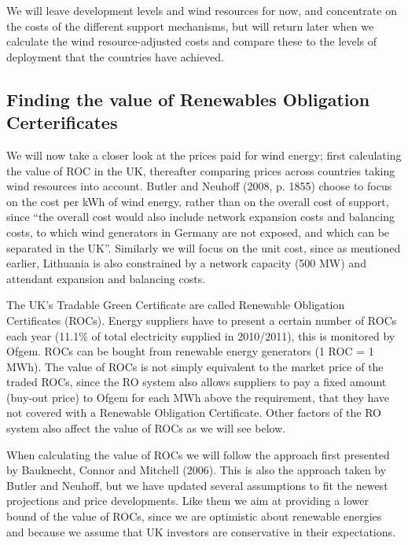 \documentclass[a4paper, 12pt]{article}
\begin{document}
We will leave development levels and wind resources for now, and concentrate on the costs of the different support mechanisms, but will return later when we calculate the wind resource-adjusted costs and compare these to the levels of deployment that the countries have achieved.

\subsection{Finding the value of Renewables Obligation Certerificates}

We will now take a closer look at the prices paid for wind energy; first calculating the value of ROC in the UK, thereafter comparing prices across countries taking wind resources into account. Butler and Neuhoff (2008, p. 1855) choose to focus on the cost per kWh of wind energy, rather than on the overall cost of support, since ``the overall cost would also include network expansion costs and balancing costs, to which wind generators in Germany are not exposed, and which can be separated in the UK''. Similarly we will focus on the unit cost, since as mentioned earlier, Lithuania is also constrained by a network capacity (500 MW) and attendant expansion and balancing costs.

The UK's Tradable Green Certificate are called Renewable Obligation Certificates (ROCs). Energy suppliers have to present a certain number of ROCs each year (11.1\% of total electricity supplied in 2010/2011), this is monitored by Ofgem. ROCs can be bought from renewable energy generators (1 ROC = 1 MWh). The value of ROCs is not simply equivalent to the market price of the traded ROCs, since the RO system also allows suppliers to pay a fixed amount (buy-out price) to Ofgem for each MWh above the requirement, that they have not covered with a Renewable Obligation Certificate. Other factors of the RO system also affect the value of ROCs as we will see below.

When calculating the value of ROCs we will follow the approach first presented by Bauknecht, Connor and Mitchell (2006). This is also the approach taken by Butler and Neuhoff, but we have updated several assumptions to fit the newest projections and price developments. Like them we aim at providing a lower bound of the value of ROCs, since we are optimistic about renewable energies and because we assume that UK investors are conservative in their expectations.
\end{document}
